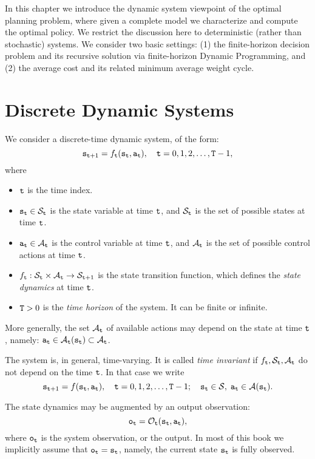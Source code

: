 

In this chapter we introduce the dynamic system viewpoint of the
optimal planning problem, where given a complete model we characterize and compute the optimal policy. We restrict the discussion here to
deterministic (rather than stochastic) systems. We consider two
basic settings: (1) the finite-horizon decision problem and its
recursive solution via finite-horizon Dynamic Programming, and (2) the
average cost and its related minimum average weight cycle.

\section{Discrete Dynamic Systems}
We consider a discrete-time dynamic system, of the form:
\[{{\tt s}_{{\tt t} + 1}} = {f_{{\tt t}}}({{\tt s}_{{\tt t}}},{{\tt a}_{{\tt t}}}),\quad {\tt t} = 0,1,2, \ldots ,{\tt T} - 1, \]
where
\begin{itemize}
  \item ${\tt t}$ is the time index.
  \item ${{\tt s}_{{\tt t}}} \in {\mathcal{S}_{{\tt t}}}$ is the state variable at time ${\tt t}$, and $\mathcal{S}_{{\tt t}}$ is the set of possible states at time
  ${\tt t}$.
  \item ${{\tt a}_{{\tt t}}} \in {\mathcal{A}_{{\tt t}}}$  is the control variable at time ${\tt t}$, and $\mathcal{A}_{{\tt t}}$ is the set of possible control actions at time
  ${\tt t}$.
  \item ${f_{{\tt t}}}:{\mathcal{S}_{{\tt t}}} \times {\mathcal{A}_{{\tt t}}} \to {\mathcal{S}_{{\tt t}+ 1}}$ is the state transition function, which defines the \emph{state dynamics} at time
  ${\tt t}$.
  \item ${\tt T}>0$ is the \emph{time horizon} of the system.  It can be finite or infinite.
\end{itemize}

\begin{remark}
    More generally, the set $\mathcal{A}_{{\tt t}}$ of available actions may depend on the state at time ${\tt t}$, namely: ${\tt a}_{{\tt t}} \in {\mathcal{A}_{{\tt t}}}({{\tt s}_{{\tt t}}}) \subset
    {\mathcal{A}_{{\tt t}}}$.
\end{remark}
\begin{remark}
The system is, in general, time-varying. It is called \emph{time
invariant} if ${f_{{\tt t}}},{\mathcal{S}_{{\tt t}}},{\mathcal{A}_{{\tt t}}}$
do not depend on the time ${\tt t}$. In that case we
    write
\[{{\tt s}_{{\tt t} + 1}} = f({{\tt s}_{{\tt t}}},{{\tt a}_{{\tt t}}}),\quad {\tt t} = 0,1,2, \ldots ,{\tt T} - 1;\quad {{\tt s}_{{\tt t}}} \in \mathcal{S},\;{{\tt a}_{{\tt t}}} \in
\mathcal{A}({{\tt s}_{{\tt t}}}).\]
\end{remark}
\begin{remark}
    The state dynamics may be augmented by an output observation:
\[{{\tt o}_{{\tt t}}} = {\mathcal{O}_{{\tt t}}}({{\tt s}_{{\tt t}}},{{\tt a}_{{\tt t}}}),\]
where  ${\tt o}_{{\tt t}}$ is the system observation, or the
output. In most of this book we  implicitly assume that
${\tt o}_{{\tt t}}={\tt s}_{{\tt t}}$, namely, the current state
${\tt s}_{{\tt t}}$ is fully observed.
\end{remark}

